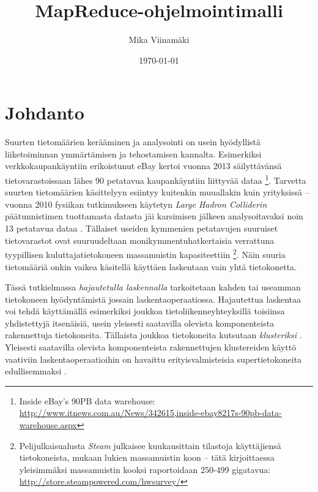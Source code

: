 \documentclass[finnish]{templates/tktltiki2}
\title{MapReduce-ohjelmointimalli}
\author{Mika Viinamäki}
\date{\today}
\theoremstyle{definition}
\theoremstyle{remark}
\begin{document}

\frontmatter      %

\maketitle        %
\makeabstract     %

\tableofcontents  %


\mainmatter       %

\section{Johdanto}\label{johdanto}

Suurten tietomäärien kerääminen ja analysointi on usein hyödyllistä
liiketoiminnan ymmärtämisen ja tehostamisen kannalta. Esimerkiksi
verkkokaupankäyntiin erikoistunut eBay kertoi vuonna 2013 säilyttävänsä
tietovarastoissaan lähes 90 petatavua kaupankäyntiin liittyvää dataa
\footnote{Inside eBay's 90PB data warehouse:
  \url{http://www.itnews.com.au/News/342615,inside-ebay8217s-90pb-data-warehouse.aspx}}.
Tarvetta suurten tietomäärien käsittelyyn esiintyy kuitenkin muuallakin
kuin yrityksissä -- vuonna 2010 fysiikan tutkimukseen käytetyn
\emph{Large Hadron Colliderin} päätunnistimen tuottamasta datasta jäi
karsimisen jälkeen analysoitavaksi noin 13 petatavua dataa
\cite{lhc}. Tällaiset useiden kymmenien petatavujen suuruiset
tietovarastot ovat suuruudeltaan monikymmentuhatkertaisia verrattuna
tyypillisen kuluttajatietokoneen massamuistin kapasiteettiin \footnote{Pelijulkaisualusta
  \emph{Steam} julkaisee kuukausittain tilastoja käyttäjiensä
  tietokoneista, mukaan lukien massamuistin koon -- tätä kirjoittaessa
  yleisimmäksi massamuistin kooksi raportoidaan 250-499 gigatavua:
  \url{http://store.steampowered.com/hwsurvey/}}. Näin suuria
tietomääriä onkin vaikea käsitellä käyttäen laskentaan vain yhtä
tietokonetta.

Tässä tutkielmassa \emph{hajautetulla laskennalla} tarkoitetaan kahden
tai useamman tietokoneen hyödyntämistä jossain laskentaoperaatiossa.
Hajautettua laskentaa voi tehdä käyttämällä esimerkiksi joukkoa
tietoliikenneyhteyksillä toisiinsa yhdistettyjä itsenäisiä, usein
yleisesti saatavilla olevista komponenteista rakennettuja tietokoneita.
Tällaista joukkoa tietokoneita kutsutaan \emph{klusteriksi}
\cite{cluster-computing}. Yleisesti saatavilla olevista
komponenteista rakennettujen klustereiden käyttö vaativiin
laskentaoperaatioihin on havaittu erityisvalmisteisia supertietokoneita
edullisemmaksi \cite{cluster-computing}.
\end{document}
